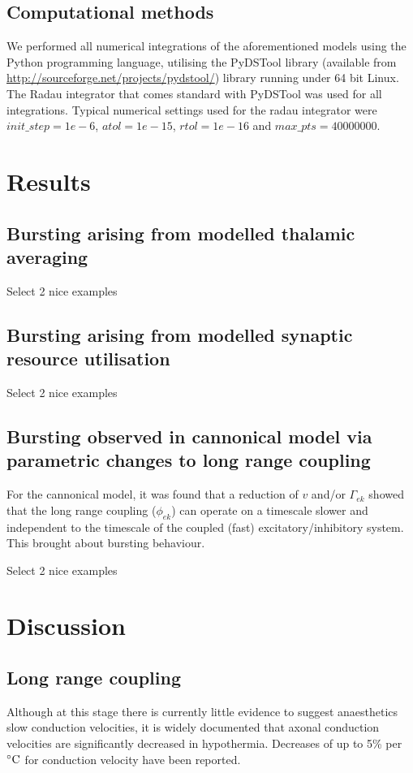 \documentclass[a4paper,12pt]{article}
\begin{document}
\subsection{Computational methods}
We performed all numerical integrations of the aforementioned models using the Python programming language, utilising
the PyDSTool library (available from \url{http://sourceforge.net/projects/pydstool/}) library running under 64 bit
Linux. The Radau integrator that comes standard with PyDSTool was used for all integrations.
Typical numerical settings used for the radau integrator were $init\_step = 1e-6$, $atol = 1e-15$, $rtol = 1e-16$ and
$max\_pts = 40000000$.

\section{Results}
\subsection{Bursting arising from modelled thalamic averaging}
Select 2 nice examples


\subsection{Bursting arising from modelled synaptic resource utilisation}
Select 2 nice examples

\subsection{Bursting observed in cannonical model via parametric changes to long range coupling}
For the cannonical model, it was found that a reduction of $v$ and/or $\Gamma_{ek}$ showed that the long range coupling
($\phi_{ek}$) can operate on a timescale slower and independent to the timescale of the coupled (fast)
excitatory/inhibitory system. This brought about bursting behaviour.

Select 2 nice examples


\section{Discussion}

\subsection{Long range coupling}
Although at this stage there is currently little evidence to suggest anaesthetics slow conduction velocities, it is
widely documented that axonal conduction velocities are significantly decreased in hypothermia. Decreases of up to 5\%
per $^{\circ}{\rm C}$ for conduction velocity have been reported.
\end{document}
